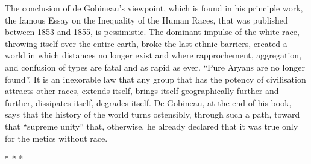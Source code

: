 \begin{quotationx}
The conclusion of de Gobineau's viewpoint, which is found in his principle work, the famous Essay on the Inequality of the Human Races, that was published between 1853 and 1855, is pessimistic. The dominant impulse of the white race, throwing itself over the entire earth, broke the last ethnic barriers, created a world in which distances no longer exist and where rapprochement, aggregation, and confusion of types are fatal and as rapid as ever. ``Pure Aryans are no longer found''. It is an inexorable law that any group that has the potency of civilisation attracts other races, extends itself, brings itself geographically further and further, dissipates itself, degrades itself. De Gobineau, at the end of his book, says that the history of the world turns ostensibly, through such a path, toward that ``supreme unity'' that, otherwise, he already declared that it was true only for the metics without race.
\end{quotationx}




\begin{center}* * *\end{center}

